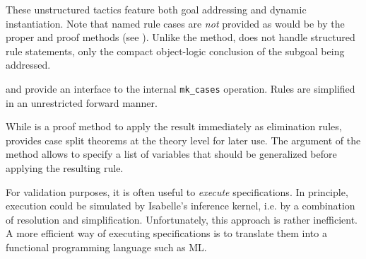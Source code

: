 \begin{isabellebody}
\begin{isamarkuptext}
\begin{description}
  These unstructured tactics feature both goal addressing and dynamic
  instantiation.  Note that named rule cases are \emph{not} provided
  as would be by the proper \hyperlink{method.cases}{\mbox{}} and \hyperlink{method.induct}{\mbox{}} proof
  methods (see ).  Unlike the \hyperlink{method.induct}{\mbox{}} method, \hyperlink{method.induct-tac}{\mbox{}} does not handle structured rule
  statements, only the compact object-logic conclusion of the subgoal
  being addressed.

  \item \hyperlink{method.HOL.ind-cases}{\mbox{}} and \hyperlink{command.HOL.inductive-cases}{\mbox{}} provide an interface to the internal \verb|mk_cases| operation.  Rules are simplified in an unrestricted
  forward manner.

  While \hyperlink{method.HOL.ind-cases}{\mbox{}} is a proof method to apply the
  result immediately as elimination rules, \hyperlink{command.HOL.inductive-cases}{\mbox{}} provides case split theorems at the theory level
  for later use.  The \hyperlink{keyword.for}{\mbox{}} argument of the \hyperlink{method.HOL.ind-cases}{\mbox{}} method allows to specify a list of variables that should
  be generalized before applying the resulting rule.

  \end{description}%
\end{isamarkuptext}%
\isamarkuptrue%
%
\isamarkuptrue%
%
\begin{isamarkuptext}%
For validation purposes, it is often useful to \emph{execute}
  specifications.  In principle, execution could be simulated by
  Isabelle's inference kernel, i.e. by a combination of resolution and
  simplification.  Unfortunately, this approach is rather inefficient.
  A more efficient way of executing specifications is to translate
  them into a functional programming language such as ML.


\end{isamarkuptext}
\end{isabellebody}
